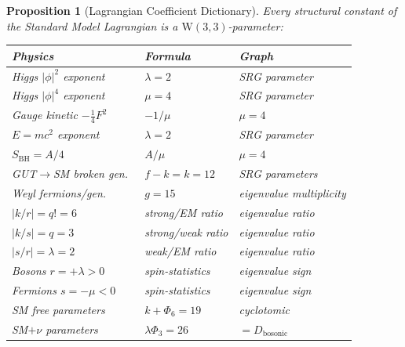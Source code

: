 \documentclass[12pt,a4paper]{article}
\newtheorem{proposition}[theorem]{Proposition}
\newcommand{\W}{\mathrm{W}(3,3)}
\begin{document}
\begin{proposition}[Lagrangian Coefficient Dictionary]\label{prop:lagrangian-dict}
Every structural constant of the Standard Model Lagrangian is a
$\W$-parameter:
\begin{center}
\begin{tabular}{lll}
\toprule
\textbf{Physics} & \textbf{Formula} & \textbf{Graph} \\
\midrule
Higgs $|\phi|^2$ exponent & $\lambda = 2$ & SRG parameter \\
Higgs $|\phi|^4$ exponent & $\mu = 4$ & SRG parameter \\
Gauge kinetic $-\tfrac14 F^2$ & $-1/\mu$ & $\mu = 4$ \\
$E = mc^2$ exponent       & $\lambda = 2$ & SRG parameter \\
$S_{\mathrm{BH}} = A/4$   & $A/\mu$ & $\mu = 4$ \\
GUT$\to$SM broken gen.\ & $f - k = k = 12$ & SRG parameters \\
Weyl fermions/gen.\ & $g = 15$ & eigenvalue multiplicity \\
$|k/r|=q!=6$ & strong/EM ratio & eigenvalue ratio \\
$|k/s|=q=3$  & strong/weak ratio & eigenvalue ratio \\
$|s/r|=\lambda=2$ & weak/EM ratio & eigenvalue ratio \\
Bosons $r=+\lambda>0$ & spin-statistics & eigenvalue sign \\
Fermions $s=-\mu<0$ & spin-statistics & eigenvalue sign \\
SM free parameters & $k + \Phi_6 = 19$ & cyclotomic \\
SM$+\nu$ parameters & $\lambda\Phi_3 = 26$ & $= D_{\mathrm{bosonic}}$ \\
\bottomrule
\end{tabular}
\end{center}
\end{proposition}
\end{document}
